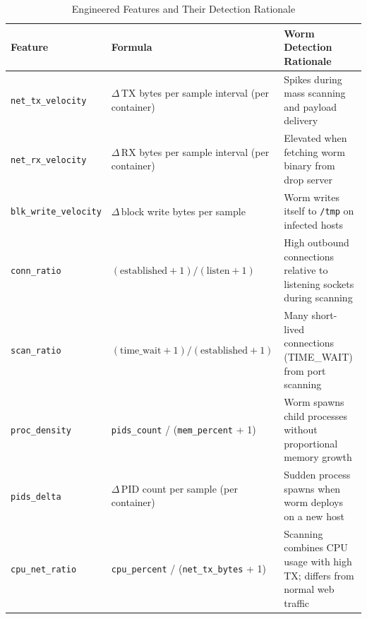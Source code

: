 \begin{table}[ht]
\centering
\caption{Engineered Features and Their Detection Rationale}
\label{tab:feature_engineering}
\begin{tabular}{p{3cm}p{4.5cm}p{4.5cm}}
\toprule
\textbf{Feature} & \textbf{Formula} & \textbf{Worm Detection Rationale} \\
\midrule
\texttt{net\_tx\_velocity}  & $\Delta$\,TX bytes per sample interval (per container) & Spikes during mass scanning and payload delivery \\
\texttt{net\_rx\_velocity}  & $\Delta$\,RX bytes per sample interval (per container) & Elevated when fetching worm binary from drop server \\
\texttt{blk\_write\_velocity} & $\Delta$\,block write bytes per sample & Worm writes itself to \texttt{/tmp} on infected hosts \\
\texttt{conn\_ratio}        & $(\text{established} + 1) / (\text{listen} + 1)$ & High outbound connections relative to listening sockets during scanning \\
\texttt{scan\_ratio}        & $(\text{time\_wait} + 1) / (\text{established} + 1)$ & Many short-lived connections (TIME\_WAIT) from port scanning \\
\texttt{proc\_density}      & \texttt{pids\_count} / (\texttt{mem\_percent} + 1) & Worm spawns child processes without proportional memory growth \\
\texttt{pids\_delta}        & $\Delta$\,PID count per sample (per container) & Sudden process spawns when worm deploys on a new host \\
\texttt{cpu\_net\_ratio}    & \texttt{cpu\_percent} / (\texttt{net\_tx\_bytes} + 1) & Scanning combines CPU usage with high TX; differs from normal web traffic \\
\bottomrule
\end{tabular}
\end{table}
